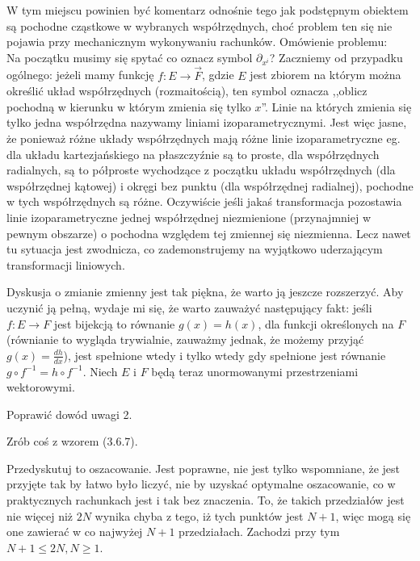 \documentclass[a4paper,11pt]{article}
\begin{document}
\start {} W tym miejscu powinien być komentarz odnośnie tego
jak podstępnym obiektem są pochodne cząstkowe w wybranych
współrzędnych, choć problem ten się nie pojawia przy mechanicznym
wykonywaniu rachunków.
Omówienie problemu: \\
Na początku musimy się spytać co oznacz symbol $\partial_{ x^{ i } }$?
Zaczniemy od przypadku ogólnego: jeżeli mamy funkcję
$f : E \to \vec{ F }$, gdzie $E$ jest zbiorem na którym można określić
układ współrzędnych (rozmaitością), ten symbol oznacza ,,oblicz
pochodną w kierunku w którym zmienia się tylko $x$''. Linie na których
zmienia się tylko jedna współrzędna nazywamy liniami
izoparametrycznymi. Jest więc jasne, że ponieważ różne układy
współrzędnych mają różne linie izoparametryczne eg. dla układu
kartezjańskiego na płaszczyźnie są to proste, dla współrzędnych
radialnych, są to półproste wychodzące z początku układu współrzędnych
(dla współrzędnej kątowej) i okręgi bez punktu (dla współrzędnej
radialnej), pochodne w tych współrzędnych są różne. Oczywiście jeśli
jakaś transformacja pozostawia linie izoparametryczne jednej
współrzędnej niezmienione (przynajmniej w pewnym obszarze) o pochodna
względem tej zmiennej się niezmienna. Lecz nawet tu sytuacja jest
zwodnicza, co zademonstrujemy na wyjątkowo uderzającym
transformacji liniowych. \\

\vspace{\spaceFour}


\start {} Dyskusja o zmianie zmienny jest tak piękna, że warto
ją jeszcze rozszerzyć. Aby uczynić ją pełną, wydaje mi się, że warto
zauważyć następujący fakt: jeśli $f : E \to F$ jest bijekcją to
równanie $g( x ) = h( x )$, dla funkcji określonych na $F$ (równianie
to wygląda trywialnie, zauważmy jednak, że możemy przyjąć
$g( x ) = \frac{ d h }{ d x }$), jest spełnione wtedy i tylko wtedy
gdy spełnione jest równanie $g \circ f^{ -1 } = h \circ f^{ -1 }$.
Niech $E$ i $F$ będą teraz unormowanymi przestrzeniami wektorowymi.

\vspace{\spaceFour}


\start {} Poprawić dowód uwagi 2.

\vspace{\spaceFour}


\start {} Zrób coś z wzorem (3.6.7).

\vspace{\spaceFour}


\start {} Przedyskutuj to oszacowanie. Jest poprawne, nie jest
tylko wspomniane, że jest przyjęte tak by łatwo było liczyć, nie by
uzyskać optymalne oszacowanie, co w praktycznych rachunkach jest i tak
bez znaczenia. To, że takich przedziałów jest nie więcej niż $2N$
wynika chyba z tego, iż tych punktów jest $N+1$, więc mogą się one
zawierać w co najwyżej $N + 1$ przedziałach. Zachodzi przy tym
$N + 1 \leq 2 N, N \geq 1$.
\end{document}

